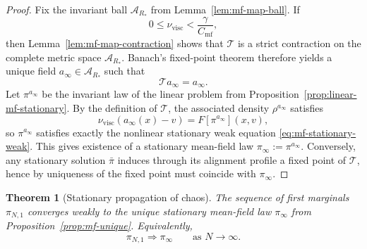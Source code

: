 \documentclass[11pt]{article}
\newtheorem{theorem}{Theorem}[section]
\theoremstyle{definition}
\theoremstyle{remark}
\begin{document}
\begin{proof}
Fix the invariant ball \(\mathcal A_{R_*}\) from
Lemma~\ref{lem:mf-map-ball}. If
\[
0\le \nu_{\mathrm{visc}}<\frac{\gamma}{C_{\mathrm{mf}}},
\]
then Lemma~\ref{lem:mf-map-contraction} shows that \(\mathcal T\) is a strict
contraction on the complete metric space \(\mathcal A_{R_*}\). Banach's
fixed-point theorem therefore yields a unique field \(a_\infty\in\mathcal A_{R_*}\)
such that
\[
\mathcal T a_\infty=a_\infty.
\]
Let \(\pi^{a_\infty}\) be the invariant law of the linear problem from
Proposition~\ref{prop:linear-mf-stationary}. By the definition of \(\mathcal T\),
the associated density \(\rho^{a_\infty}\) satisfies
\[
\nu_{\mathrm{visc}}(a_\infty(x)-v)=F[\pi^{a_\infty}](x,v),
\]
so \(\pi^{a_\infty}\) satisfies exactly the nonlinear stationary weak equation
\eqref{eq:mf-stationary-weak}. This gives existence of a stationary mean-field
law \(\pi_\infty:=\pi^{a_\infty}\). Conversely, any stationary solution
\(\bar\pi\) induces through its alignment profile a fixed point of
\(\mathcal T\), hence by uniqueness of the fixed point must coincide with
\(\pi_\infty\).
\end{proof}

\begin{theorem}[Stationary propagation of chaos]\label{thm:stationary-poc}
The sequence of first marginals $\pi_{N,1}$ converges weakly to the unique
stationary mean-field law $\pi_\infty$ from
Proposition~\ref{prop:mf-unique}. Equivalently,
\[
\pi_{N,1}\Rightarrow \pi_\infty
\qquad\text{as }N\to\infty.
\]
\end{theorem}
\end{document}
